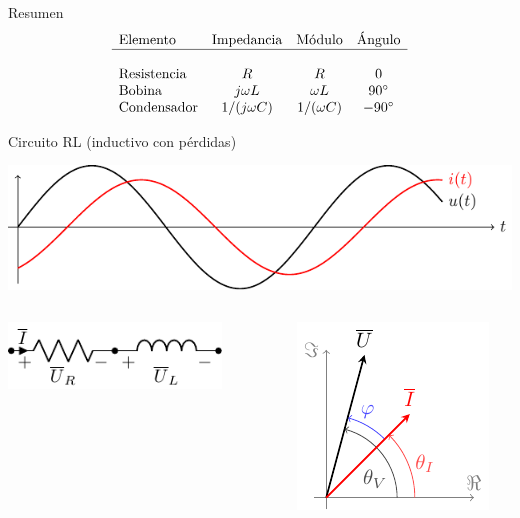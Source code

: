 \documentclass[aspectratio=169, usenames,svgnames,dvipsnames]{beamer}
\begin{document}
\begin{frame}[label={sec:orgf2a8a26}]{Resumen}
\[
  \begin{array}{lccc}
    \text{Elemento} & \text{Impedancia} & \text{Módulo} & \text{Ángulo}\\
    \hline\\
    \text{Resistencia} & R & R & 0\\
    \text{Bobina} & j \omega L & \omega L & \ang{90}\\
     \text{Condensador} & 1/(j \omega C) & 1/(\omega C) & \ang{-90}\\
  \end{array}
\]
\end{frame}
\begin{frame}[label={sec:org1446141}]{Circuito RL (inductivo con pérdidas)}
\begin{center}
\includegraphics[height=0.25\textheight]{../figs/inductivo.pdf}
\end{center}
\begin{columns}
\begin{column}{0.45\columnwidth}
\begin{center}
\includegraphics[width=0.8\textwidth]{../figs/RL.pdf}
\end{center}
\end{column}


\begin{column}{0.55\columnwidth}
\begin{center}
\includegraphics[height=0.5\textheight]{../figs/fasorInductanciaReal_VI.pdf}
\end{center}
\end{column}
\end{columns}
\end{frame}
\end{document}
